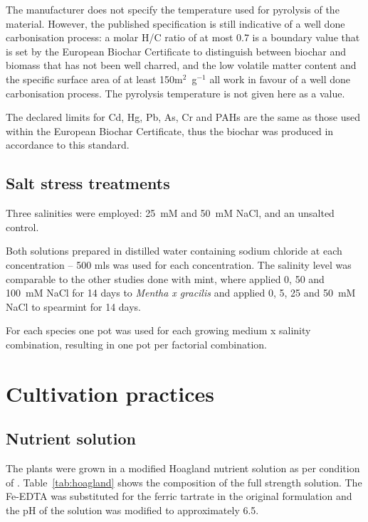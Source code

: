 The manufacturer does not specify the temperature used for pyrolysis of the material. However, the published specification is still indicative of a well done carbonisation process: a molar H/C ratio of at most 0.7 is a boundary value that is set by the European Biochar Certificate to distinguish between biochar and biomass that has not been well charred, and the low volatile matter content and the specific surface area of at least 150m$^2$~g$^{-1}$ all work in favour of a well done carbonisation process. The pyrolysis temperature is not given here as a value.

The declared limits for Cd, Hg, Pb, As, Cr and PAHs are the same as those used within the European Biochar Certificate, thus the biochar was produced in accordance to this standard.

\subsection{Salt stress treatments}

Three salinities were employed: 25~mM and 50~mM NaCl, and an unsalted control.

Both solutions prepared in distilled water containing sodium chloride at each concentration – 500 mls was used for each concentration. The salinity level was comparable to the other studies done with mint, where \textcite{Morshedloo2025} applied 0, 50 and 100~mM NaCl for 14 days to \textit{Mentha x gracilis} and \textcite{Ounoki2021} applied 0, 5, 25 and 50~mM NaCl to spearmint for 14 days.

For each species one pot was used for each growing medium x salinity combination, resulting in one pot per factorial combination.

\section{Cultivation practices}

\subsection{Nutrient solution}

The plants were grown in a modified Hoagland nutrient solution as per condition of \textcite{Hoagland1950}. Table~\ref{tab:hoagland} shows the composition of the full strength solution. The Fe-EDTA was substituted for the ferric tartrate in the original formulation and the pH of the solution was modified to approximately 6.5.

